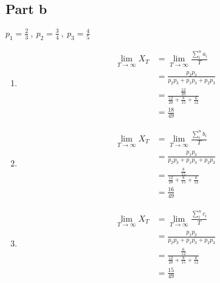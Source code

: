 \documentclass[a4paper, fleqn]{article}
\begin{document}
\subsection{Part b}
$p_1=\frac{2}{3}\ ,\ p_2=\frac{3}{4}\ ,\ p_3=\frac{4}{5}$
\begin{enumerate}[label=\textbf{For Child \Alph*}]
\item $$
\begin{aligned}
\lim_{T\rightarrow\infty}X_T&=\lim_{T\rightarrow\infty}\frac{\sum_i^n a_i}{T}\\
&=\frac{p_2p_3}{p_2p_3+p_1p_3+p_2p_3}\\
&=\frac{\frac{12}{20}}{\frac{12}{20}+\frac{8}{15}+\frac{6}{12}}\\
&=\frac{18}{49}
\end{aligned}
$$
\item $$
\begin{aligned}
\lim_{T\rightarrow\infty}X_T&=\lim_{T\rightarrow\infty}\frac{\sum_i^n b_i}{T}\\
&=\frac{p_1p_3}{p_2p_3+p_1p_3+p_2p_3}\\
&=\frac{\frac{8}{15}}{\frac{12}{20}+\frac{8}{15}+\frac{6}{12}}\\
&=\frac{16}{49}
\end{aligned}
$$
\item $$
\begin{aligned}
\lim_{T\rightarrow\infty}X_T&=\lim_{T\rightarrow\infty}\frac{\sum_i^n c_i}{T}\\
&=\frac{p_1p_2}{p_2p_3+p_1p_3+p_2p_3}\\
&=\frac{\frac{6}{12}}{\frac{12}{20}+\frac{8}{15}+\frac{6}{12}}\\
&=\frac{15}{49}
\end{aligned}
$$
\end{enumerate}
\pagebreak
\end{document}

